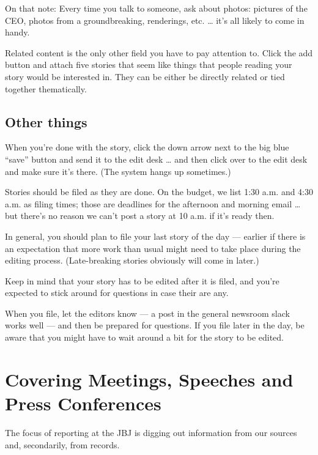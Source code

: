 \documentclass[
  12pt,
  american,
  letterpaperpaper,
  extrafontsizes,onecolumn,openright
  ]{memoir}
\begin{document}
On that note: Every time you talk to someone, ask about photos: pictures of the CEO, photos from a groundbreaking, renderings, etc. \ldots{} it's all likely to come in handy.

Related content is the only other field you have to pay attention to. Click the add button and attach five stories that seem like things that people reading your story would be interested in. They can be either be directly related or tied together thematically.

\hypertarget{other-things}{%
\section*{Other things}\label{other-things}}

When you're done with the story, click the down arrow next to the big blue \enquote{save} button and send it to the edit desk \ldots{} and then click over to the edit desk and make sure it's there. (The system hangs up sometimes.)

Stories should be filed as they are done. On the budget, we list 1:30 a.m. and 4:30 a.m. as filing times; those are deadlines for the afternoon and morning email \ldots{} but there's no reason we can't post a story at 10 a.m. if it's ready then.

In general, you should plan to file your last story of the day --- earlier if there is an expectation that more work than usual might need to take place during the editing process. (Late-breaking stories obviously will come in later.)

Keep in mind that your story has to be edited after it is filed, and you're expected to stick around for questions in case their are any.

When you file, let the editors know --- a post in the general newsroom slack works well --- and then be prepared for questions. If you file later in the day, be aware that you might have to wait around a bit for the story to be edited.

\hypertarget{covering-meetings-speeches-and-press-conferences}{%
\chapter{Covering Meetings, Speeches and Press Conferences}\label{covering-meetings-speeches-and-press-conferences}}

The focus of reporting at the JBJ is digging out information from our sources and, secondarily, from records.
\end{document}
